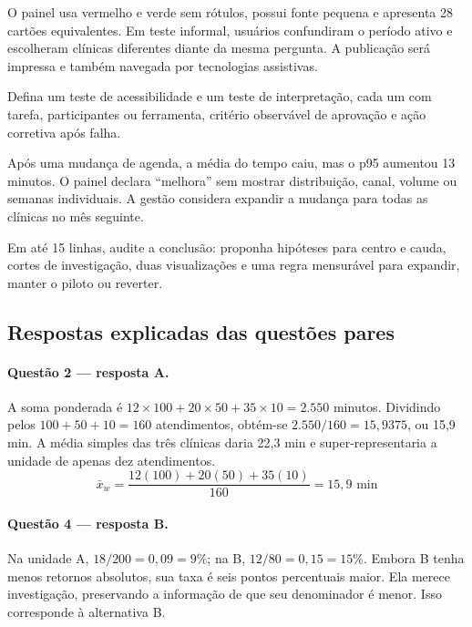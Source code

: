 
\TextoBase

O painel usa vermelho e verde sem rótulos, possui fonte pequena e apresenta 28 cartões equivalentes. Em teste informal, usuários confundiram o período ativo e escolheram clínicas diferentes diante da mesma pergunta. A publicação será impressa e também navegada por tecnologias assistivas.

\FonteDidatica

\Comando Defina um teste de acessibilidade e um teste de interpretação, cada um com tarefa, participantes ou ferramenta, critério observável de aprovação e ação corretiva após falha.


\TextoBase

Após uma mudança de agenda, a média do tempo caiu, mas o p95 aumentou 13 minutos. O painel declara ``melhora'' sem mostrar distribuição, canal, volume ou semanas individuais. A gestão considera expandir a mudança para todas as clínicas no mês seguinte.

\FonteDidatica

\Comando Em até 15 linhas, audite a conclusão: proponha hipóteses para centro e cauda, cortes de investigação, duas visualizações e uma regra mensurável para expandir, manter o piloto ou reverter.

\newpage

\subsection{Respostas explicadas das questões pares}

\paragraph{Questão 2 --- resposta A.} A soma ponderada é $12\times100+20\times50+35\times10=2.550$ minutos. Dividindo pelos $100+50+10=160$ atendimentos, obtém-se $2.550/160=15{,}9375$, ou 15,9 min. A média simples das três clínicas daria 22,3 min e super-representaria a unidade de apenas dez atendimentos.
\[\bar x_w=\frac{12(100)+20(50)+35(10)}{160}=15{,}9\text{ min}\]

\paragraph{Questão 4 --- resposta B.} Na unidade A, $18/200=0{,}09=9\%$; na B, $12/80=0{,}15=15\%$. Embora B tenha menos retornos absolutos, sua taxa é seis pontos percentuais maior. Ela merece investigação, preservando a informação de que seu denominador é menor. Isso corresponde à alternativa B.

